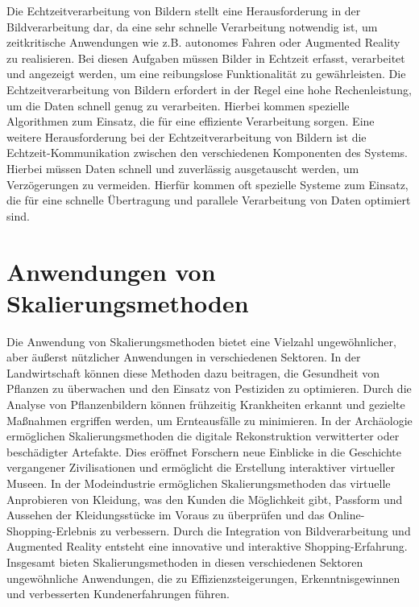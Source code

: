     Die Echtzeitverarbeitung von Bildern stellt eine Herausforderung in der Bildverarbeitung dar, da eine sehr schnelle Verarbeitung notwendig ist, um zeitkritische Anwendungen wie z.B. autonomes Fahren oder Augmented Reality zu realisieren.
    Bei diesen Aufgaben müssen Bilder in Echtzeit erfasst, verarbeitet und angezeigt werden, um eine reibungslose Funktionalität zu gewährleisten.
    Die Echtzeitverarbeitung von Bildern erfordert in der Regel eine hohe Rechenleistung, um die Daten schnell genug zu verarbeiten.
    Hierbei kommen spezielle Algorithmen zum Einsatz, die für eine effiziente Verarbeitung sorgen.
    Eine weitere Herausforderung bei der Echtzeitverarbeitung von Bildern ist die Echtzeit-Kommunikation zwischen den verschiedenen Komponenten des Systems. 
    Hierbei müssen Daten schnell und zuverlässig ausgetauscht werden, um Verzögerungen zu vermeiden. 
    Hierfür kommen oft spezielle Systeme zum Einsatz, die für eine schnelle Übertragung und parallele Verarbeitung von Daten optimiert sind.
\section{Anwendungen von Skalierungsmethoden}
    Die Anwendung von Skalierungsmethoden bietet eine Vielzahl ungewöhnlicher, aber äußerst nützlicher Anwendungen in verschiedenen Sektoren.
    In der Landwirtschaft können diese Methoden dazu beitragen, die Gesundheit von Pflanzen zu überwachen und den Einsatz von Pestiziden zu optimieren.
    Durch die Analyse von Pflanzenbildern können frühzeitig Krankheiten erkannt und gezielte Maßnahmen ergriffen werden, um Ernteausfälle zu minimieren.
    In der Archäologie ermöglichen Skalierungsmethoden die digitale Rekonstruktion verwitterter oder beschädigter Artefakte.
    Dies eröffnet Forschern neue Einblicke in die Geschichte vergangener Zivilisationen und ermöglicht die Erstellung interaktiver virtueller Museen.
    In der Modeindustrie ermöglichen Skalierungsmethoden das virtuelle Anprobieren von Kleidung, was den Kunden die Möglichkeit gibt, Passform und Aussehen der Kleidungsstücke im Voraus zu überprüfen und das Online-Shopping-Erlebnis zu verbessern.
    Durch die Integration von Bildverarbeitung und Augmented Reality entsteht eine innovative und interaktive Shopping-Erfahrung.
    Insgesamt bieten Skalierungsmethoden in diesen verschiedenen Sektoren ungewöhnliche Anwendungen, die zu Effizienzsteigerungen, Erkenntnisgewinnen und verbesserten Kundenerfahrungen führen.
\newpage